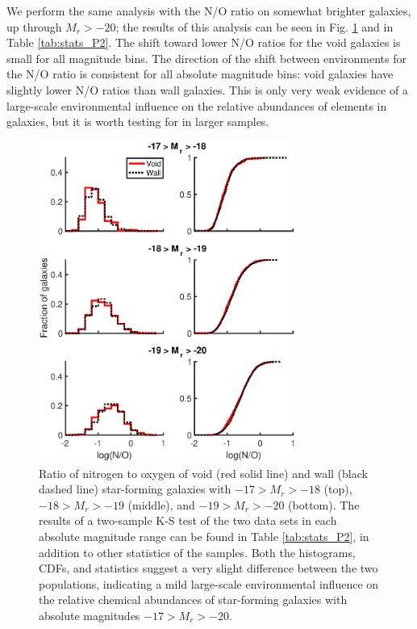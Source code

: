 We perform the same analysis with the N/O ratio on somewhat brighter galaxies, 
up through $M_r > -20$; the results of this analysis can be seen in Fig. 
\ref{fig:NO_bright} and in Table \ref{tab:stats_P2}.  The shift toward lower N/O 
ratios for the void galaxies is small for all magnitude bins.  The direction of 
the shift between environments for the N/O ratio is consistent for all absolute 
magnitude bins: void galaxies have slightly lower N/O ratios than wall galaxies.  
This is only very weak evidence of a large-scale environmental influence on the 
relative abundances of elements in galaxies, but it is worth testing for in 
larger samples.

\begin{figure}
    \centering
    \includegraphics[width=0.75\textwidth]{Images/Paper2/1sig_17-20_SF_t3_logNO_stacked}
    \caption[N/O distribution of star-forming galaxies with $-17 > M_r > -20$]
    {Ratio of nitrogen to oxygen of void (red solid line) and wall (black dashed 
    line) star-forming galaxies with $-17 > M_r > -18$ (top), $-18 > M_r > -19$ 
    (middle), and $-19 > M_r > -20$ (bottom).  The results of a two-sample K-S 
    test of the two data sets in each absolute magnitude range can be found in 
    Table \ref{tab:stats_P2}, in addition to other statistics of the samples.  
    Both the histograms, CDFs, and statistics suggest a very slight difference 
    between the two populations, indicating a mild large-scale environmental 
    influence on the relative chemical abundances of star-forming galaxies with 
    absolute magnitudes $-17 > M_r > -20$.}
    \label{fig:NO_bright}
\end{figure}

